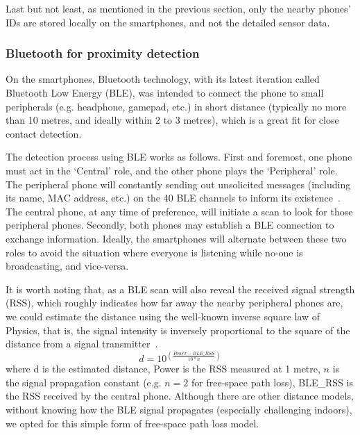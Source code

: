 \documentclass[graybox]{svmult}
\begin{document}
Last but not least, as mentioned in the previous section, only the nearby phones' IDs are stored locally on the smartphones, and not the detailed sensor data.





\subsubsection{Bluetooth for proximity detection}
\label{bluetooth}
On the smartphones, Bluetooth technology, with its latest iteration called Bluetooth Low Energy (BLE), was intended to connect the phone to small peripherals (e.g. headphone, gamepad, etc.) in short distance (typically no more than 10 metres, and ideally within 2 to 3 metres), which is a great fit for close contact detection.

The detection process using BLE works as follows. First and foremost, one phone must act in the `Central' role, and the other phone plays the `Peripheral' role. The peripheral phone will constantly sending out unsolicited messages (including its name, MAC address, etc.) on the 40 BLE channels to inform its existence~\cite{contreras2017performance,de2017study,faragher2015location,kalbandhe2016indoor}. The central phone, at any time of preference, will initiate a scan to look for those peripheral phones. Secondly, both phones may establish a BLE connection to exchange information. Ideally, the smartphones will alternate between these two roles to avoid the situation where everyone is listening while no-one is broadcasting, and vice-versa.

It is worth noting that, as a BLE scan will also reveal the received signal strength (RSS), which roughly indicates how far away the nearby peripheral phones are, we could estimate the distance using the well-known inverse square law of Physics, that is, the signal intensity is inversely proportional to the square of the distance from a signal transmitter~\cite{goldsmith2005wireless}.
\begin{equation}
    d = 10^{(\frac{Power - BLE\_RSS} {10 * n})}
\end{equation}
where d is the estimated distance, Power is the RSS measured at 1 metre, $n$ is the signal propagation constant (e.g. $n = 2$ for free-space path loss), BLE\_RSS is the RSS received by the central phone. Although there are other distance models, without knowing how the BLE signal propagates (especially challenging indoors), we opted for this simple form of free-space path loss model.
\end{document}
